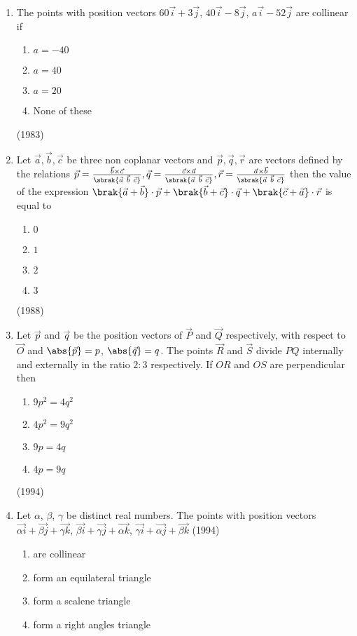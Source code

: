\begin{enumerate}[label=\thesubsection.\arabic*.,ref=\thesubsection.\theenumi]
\item The points with position vectors $60\vec{i} + 3\vec{j}$, $40\vec{i}-8\vec{j}$, $a\vec{i}-52\vec{j}$ are collinear if
  \begin{multicols}{2}
\begin{enumerate}
\item $a=-40$
\item $a=40$
\item $a=20$
\item None of these
\end{enumerate}
  \end{multicols}
\hfill (1983)
\item Let $\vec{a}, \vec{b}, \vec{c}$ be three non coplanar vectors and $\vec{p}, \vec{q},\vec{r}$ are vectors defined by the relations $\vec{p}=\frac{\vec{b}\times\vec{c}}{\sbrak{\vec{a}\ \vec{b}\ \vec{c}}}, \vec{q}=\frac{\vec{c}\times\vec{a}}{\sbrak{\vec{a}\ \vec{b}\ \vec{c}}},\vec{r}=\frac{\vec{a}\times\vec{b}}{\sbrak{\vec{a}\ \vec{b}\ \vec{c}}}$ then the value of the expression $\brak{\vec{a}+\vec{b}}\cdot\vec{p}+\brak{\vec{b}+\vec{c}}\cdot\vec{q}+\brak{\vec{c}+\vec{a}}\cdot\vec{r}$ is equal to
  \begin{multicols}{2}
\begin{enumerate}
\item $0$
\item $1$
\item $2$
\item $3$
\end{enumerate}
  \end{multicols}
\hfill (1988)
\item Let $\vec{p}$ and $\vec{q}$ be the position vectors of $\vec{P}$ and $\vec{Q}$ respectively, with respect to $\vec{O}$ and $\abs{\vec{p}} = p$, $\abs{\vec{q}} = q$. The points $\vec{R}$ and $\vec{S}$ divide $PQ$ internally and externally in the ratio $2\colon3$ respectively. If $OR$ and $OS$ are perpendicular then
\begin{enumerate}
\item $9p^2 =4q^2$
\item $4p^2 = 9q^2$
\item $9p = 4q$
\item $4p = 9q$
\end{enumerate}
\hfill (1994)
\item Let $\alpha$, $\beta$, $\gamma$ be distinct real numbers. The points with position vectors $\vec{\alpha i}+ \vec{\beta j} + \vec{\gamma k}$, $\vec{\beta i}+ \vec{\gamma j}+ \vec{\alpha k}$, $\vec{\gamma i} + \vec{\alpha j} + \vec{\beta k}$
\hfill (1994)
  \begin{multicols}{2}
\begin{enumerate}
\item are collinear
\item form an equilateral triangle
\item form a scalene triangle
\item form a right angles triangle
\end{enumerate}
  \end{multicols}


\end{enumerate}
